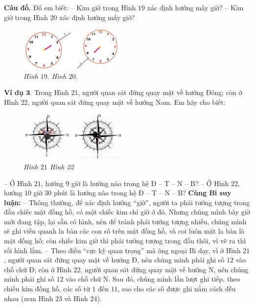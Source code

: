 	\textbf{\color{toancuabi}Câu đố.} Đố em biết:
	\vskip 0.05cm
	-- Kim giờ trong Hình $19$ xác định hướng  mấy giờ?
	\vskip 0.05cm
	-- Kim giờ trong Hình $20$ xác định hướng  mấy giờ?
		\begin{figure}[H]
		\centering
		\vspace*{-5pt}
		\captionsetup{labelformat= empty, justification=centering}
		\includegraphics[width=0.465\textwidth]{pic17}
		\caption{\small\textit{Hình $19.$ \hspace*{80pt} Hình $20.$}}
		\vspace*{-10pt}
	\end{figure}
	\textbf{\color{toancuabi}Ví dụ $\pmb3.$} Trong Hình $21$, người quan sát đứng quay mặt về hướng Đông; còn ở Hình $22$, người quan sát đứng quay mặt về hướng Nam. Em hãy cho biết:
			\begin{figure}[H]
		\centering
		\vspace*{-5pt}
		\captionsetup{labelformat= empty, justification=centering}
		\includegraphics[width=0.48\textwidth]{pic18}
		\caption{\small\textit{Hình $21$ \hspace*{80pt} Hình 22}}
		\vspace*{-5pt}
	\end{figure}
	-- Ở Hình $21$, hướng $9$ giờ là hướng nào trong hệ Đ -- T -- N -- B?
	\vskip 0.05cm
	-- Ở Hình $22$, hướng $10$ giờ $30$ phút là hướng nào trong hệ Đ -- T -- N -- B?
	\vskip 0.05cm
	\textbf{\color{toancuabi}Cùng Bi suy luận:}
	\vskip 0.1cm
	-- Thông thường, để xác định hướng “giờ”, người ta phải tưởng tượng trong đầu chiếc mặt đồng hồ, có một chiếc kim chỉ giờ ở đó. Nhưng chúng mình bây giờ mới đang tập, lại sẵn có hình, nên để tránh phải tưởng tượng nhiều, chúng mình sẽ ghi viền quanh la bàn các con số trên mặt đồng hồ, và coi luôn mặt la bàn là mặt đồng hồ; còn chiếc kim giờ thì phải tưởng tượng trong đầu thôi, vì vẽ ra thì rối hình lắm.
	\vskip 0.1cm
	-- Theo điều “cực kỳ quan trọng” mà ông ngoại Bi dạy, vì ở Hình $21$, người quan sát đứng quay mặt về hướng Đ, nên chúng mình phải ghi số $12$ vào chỗ chữ Đ; còn ở Hình $22$, người quan sát đứng quay mặt về hướng N, nên chúng mình phải ghi số $12$ vào chỗ chữ N. Sau đó, chúng mình lần lượt ghi tiếp, theo chiều kim đồng hồ, các số từ $1$ đến $11$, sao cho các số được ghi nằm cách đều nhau (xem Hình $23$ và Hình $24$).
